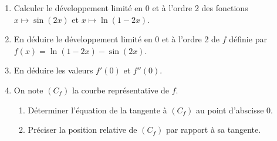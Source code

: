 
\begin{exercice}\label{exoautoanalyseCTU-53}



\begin{enumerate}
\item Calculer le développement limité en 0 et à l'ordre 2 des fonctions $x \mapsto \sin (2x)$ et $x \mapsto \ln (1-2x)$.
\item En déduire le développement limité en 0 et à l'ordre 2 de $f$ définie par $f(x)=\ln (1-2x)-\sin(2x)$.
\item En déduire les valeurs $f'(0)$ et $f''(0)$.
\item On note $(C_{f})$ la courbe représentative de $f$. 
\begin{enumerate}
\item Déterminer l'équation de la tangente à $(C_{f})$ au point d'abscisse 0.
\item Préciser la position relative de $(C_{f})$ par rapport à sa tangente.
\end{enumerate}

\end{enumerate}


\end{exercice}
